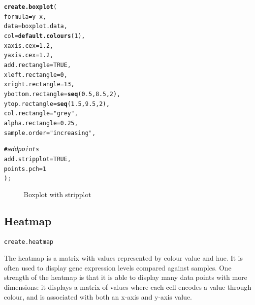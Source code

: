 \documentclass[letterpaper]{report}\usepackage[]{graphicx}\usepackage[]{color}
\makeatletter
\newcommand{\hlnum}[1]{\textcolor[rgb]{0.686,0.059,0.569}{#1}}%
\newcommand{\hlstr}[1]{\textcolor[rgb]{0.192,0.494,0.8}{#1}}%
\newcommand{\hlcom}[1]{\textcolor[rgb]{0.678,0.584,0.686}{\textit{#1}}}%
\newcommand{\hlopt}[1]{\textcolor[rgb]{0,0,0}{#1}}%
\newcommand{\hlstd}[1]{\textcolor[rgb]{0.345,0.345,0.345}{#1}}%
\newcommand{\hlkwc}[1]{\textcolor[rgb]{0.333,0.667,0.333}{#1}}%
\newcommand{\hlkwd}[1]{\textcolor[rgb]{0.737,0.353,0.396}{\textbf{#1}}}%
\newenvironment{kframe}{%
 \def\at@end@of@kframe{}%
 \ifinner\ifhmode%
  \def\at@end@of@kframe{\end{minipage}}%
  \begin{minipage}{\columnwidth}%
 \fi\fi%
 \def\FrameCommand##1{\hskip\@totalleftmargin \hskip-\fboxsep
 \colorbox{shadecolor}{##1}\hskip-\fboxsep
     \hskip-\linewidth \hskip-\@totalleftmargin \hskip\columnwidth}%
 \MakeFramed {\advance\hsize-\width
   \@totalleftmargin\z@ \linewidth\hsize
   \@setminipage}}%
 {\par\unskip\endMakeFramed%
 \at@end@of@kframe}
\newenvironment{knitrout}{}{} %
\makeatother
\begin{document}
\begin{knitrout}
\color{fgcolor}\begin{kframe}
\begin{alltt}
\hlkwd{create.boxplot}\hlstd{(}
    \hlkwc{formula} \hlstd{= y} \hlopt{~} \hlstd{x,}
    \hlkwc{data} \hlstd{= boxplot.data,}
    \hlkwc{col} \hlstd{=} \hlkwd{default.colours}\hlstd{(}\hlnum{1}\hlstd{),}
    \hlkwc{xaxis.cex} \hlstd{=} \hlnum{1.2}\hlstd{,}
    \hlkwc{yaxis.cex} \hlstd{=} \hlnum{1.2}\hlstd{,}
    \hlkwc{add.rectangle} \hlstd{=} \hlnum{TRUE}\hlstd{,}
    \hlkwc{xleft.rectangle} \hlstd{=} \hlnum{0}\hlstd{,}
    \hlkwc{xright.rectangle} \hlstd{=} \hlnum{13}\hlstd{,}
    \hlkwc{ybottom.rectangle} \hlstd{=} \hlkwd{seq}\hlstd{(}\hlnum{0.5}\hlstd{,} \hlnum{8.5}\hlstd{,} \hlnum{2}\hlstd{),}
    \hlkwc{ytop.rectangle} \hlstd{=} \hlkwd{seq}\hlstd{(}\hlnum{1.5}\hlstd{,} \hlnum{9.5}\hlstd{,} \hlnum{2}\hlstd{),}
    \hlkwc{col.rectangle} \hlstd{=} \hlstr{"grey"}\hlstd{,}
    \hlkwc{alpha.rectangle} \hlstd{=} \hlnum{0.25}\hlstd{,}
    \hlkwc{sample.order} \hlstd{=} \hlstr{"increasing"}\hlstd{,}

    \hlcom{# add points}
    \hlkwc{add.stripplot} \hlstd{=} \hlnum{TRUE}\hlstd{,}
    \hlkwc{points.pch} \hlstd{=} \hlnum{1}
    \hlstd{);}
\end{alltt}
\end{kframe}\begin{figure}

{\centering {} 

}

\caption[Boxplot with stripplot]{Boxplot with stripplot}\label{fig:boxplot5}
\end{figure}


\end{knitrout}

\subsection{Heatmap}
\begin{verbatim}
create.heatmap
\end{verbatim}

The heatmap is a matrix with values represented by colour value and hue. It is often used to display gene expression levels compared against samples. One strength of the heatmap is that it is able to display many data points with more dimensions: it displays a matrix of values where each cell encodes a value through colour, and is associated with both an x-axis and y-axis value. 
\end{document}
